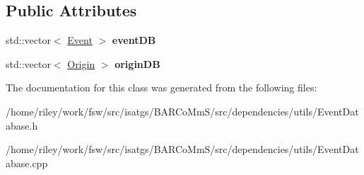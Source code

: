 \subsection*{Public Attributes}
\begin{DoxyCompactItemize}
\item 
std\+::vector$<$ \hyperlink{structisat__utils_1_1_event_database_1_1_event}{Event} $>$ {\bfseries event\+DB}\hypertarget{classisat__utils_1_1_event_database_a4a8c02c3743ba490fc83f61b64761894}{}\label{classisat__utils_1_1_event_database_a4a8c02c3743ba490fc83f61b64761894}

\item 
std\+::vector$<$ \hyperlink{structisat__utils_1_1_event_database_1_1_origin}{Origin} $>$ {\bfseries origin\+DB}\hypertarget{classisat__utils_1_1_event_database_a8448b1621a77477f6bd7d720d277ecd9}{}\label{classisat__utils_1_1_event_database_a8448b1621a77477f6bd7d720d277ecd9}

\end{DoxyCompactItemize}


The documentation for this class was generated from the following files\+:\begin{DoxyCompactItemize}
\item 
/home/riley/work/fsw/src/isatgs/\+B\+A\+R\+Co\+Mm\+S/src/dependencies/utils/Event\+Database.\+h\item 
/home/riley/work/fsw/src/isatgs/\+B\+A\+R\+Co\+Mm\+S/src/dependencies/utils/Event\+Database.\+cpp\end{DoxyCompactItemize}
